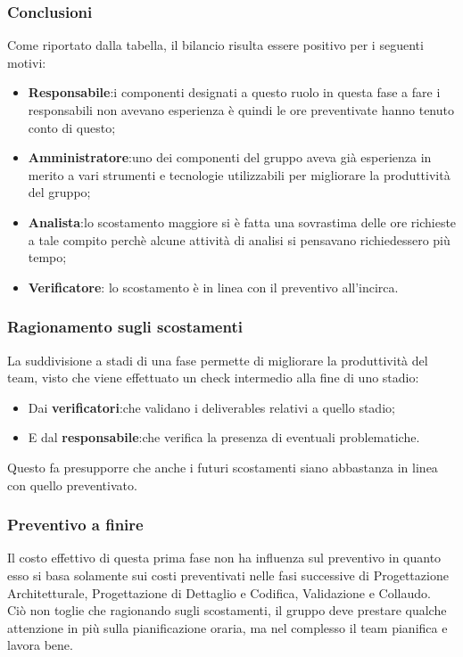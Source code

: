\subsubsection{Conclusioni}
Come riportato dalla tabella, il bilancio risulta essere positivo per i seguenti motivi:
\begin{itemize}
	\item \textbf{Responsabile}:{i componenti designati a questo ruolo in questa fase a fare i responsabili non avevano esperienza è quindi le ore preventivate hanno tenuto conto di questo; }
	\item \textbf{Amministratore}:{uno dei componenti del gruppo aveva già esperienza in merito a vari strumenti e tecnologie utilizzabili per migliorare la produttività del gruppo;}
	\item \textbf{Analista}:{lo scostamento maggiore si è fatta una sovrastima delle ore richieste a tale compito perchè alcune attività di analisi si pensavano richiedessero più tempo;}
	\item \textbf{Verificatore}: {lo scostamento è in linea con il preventivo all'incirca.}
\end{itemize}

\subsubsection{Ragionamento sugli scostamenti}
La suddivisione a stadi di una fase permette di migliorare la produttività del team, visto che viene effettuato un check intermedio alla fine di uno stadio:
\begin{itemize}
	\item Dai \textbf{verificatori}:che validano i deliverables relativi a quello stadio;
	\item E dal \textbf{responsabile}:che verifica la presenza di eventuali problematiche.
\end{itemize}
Questo fa presupporre che anche i futuri scostamenti siano abbastanza in linea con quello preventivato.
\subsubsection{Preventivo a finire}
Il costo effettivo di questa prima fase non ha influenza sul preventivo in quanto esso si basa solamente sui costi preventivati nelle fasi successive di Progettazione Architetturale, Progettazione di Dettaglio e Codifica, Validazione e Collaudo.\\
Ciò non toglie che ragionando sugli scostamenti, il gruppo deve prestare qualche attenzione in più sulla pianificazione oraria, ma nel complesso il team pianifica e lavora bene.

